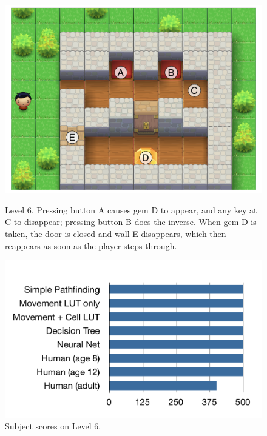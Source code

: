 \documentclass{article}
\begin{document}
\begin{figure}[ht]
\begin{minipage}[t]{0.45\linewidth}
\centering
\includegraphics[width=\textwidth]{figLevel6.pdf}
\caption{Level 6. Pressing button A causes gem D to appear, and any key at C to disappear; pressing button B does the inverse.  When gem D is taken, the door is closed and wall E disappears, which then reappears as soon as the player steps through.}
\label{figLevel6}
\end{minipage}
\hspace{0.5cm}
\begin{minipage}[b]{0.45\linewidth}
\centering
\includegraphics[width=\textwidth]{figScores6.pdf}
\caption{Subject scores on Level 6.}
\label{figScores6}
\end{minipage}
\end{figure}
\end{document}
